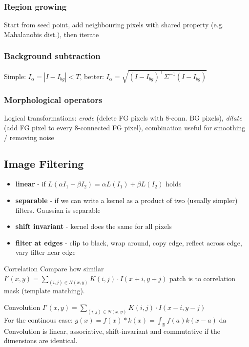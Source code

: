 \documentclass[a4paper,10pt]{article}
\begin{document}
\subsubsection{Region growing}
Start from seed point, add neighbouring pixels with shared property (e.g. Mahalanobis dist.), then iterate

\subsubsection{Background subtraction}
Simple: \( I_\alpha = \left| I - I_{bg} \right| < T \), better: \( I_\alpha = \sqrt{(I-I_{bg})^\top \Sigma^{-1} (I-I_{bg})}  \)

\subsubsection{Morphological operators} 
Logical transformations: \textit{erode} (delete FG pixels with 8-conn. BG pixels), \textit{dilate} (add FG pixel to every 8-connected FG pixel), combination useful for smoothing / removing noise

\subsection{Image Filtering}
\begin{itemize}
    \item \textbf{linear} - if \( L(\alpha I_{1} + \beta I_{2}) = \alpha L(I_{1}) + \beta L(I_{2}) \) holds
    \item \textbf{separable} - if we can write a kernel as a product of two (usually simpler) filters. Gaussian is separable
    \item \textbf{shift invariant} - kernel does the same for all pixels
    \item \textbf{filter at edges} - clip to black, wrap around, copy edge, reflect across edge, vary filter near edge
\end{itemize}
\begin{mainbox}{Correlation}
    Compare how similar \( I'(x,y) = \sum_{(i,j) \in N(x,y)} K(i,j) \cdot I(x+i,y+j) \) patch is to correlation mask (template matching).
\end{mainbox}

\begin{mainbox}{Convolution}
    \( I'(x,y) = \sum_{(i,j) \in N(x,y)} K(i,j) \cdot I(x-i, y-j) \)\\
    For the continous case: \( g(x) = f(x) * k(x) = \int_\mathbb{R} f(a) k(x-a) \mathop{da}  \)\\
    Convolution is linear, associative, shift-invariant and commutative if the dimensions are identical.
\end{mainbox}
\end{document}
